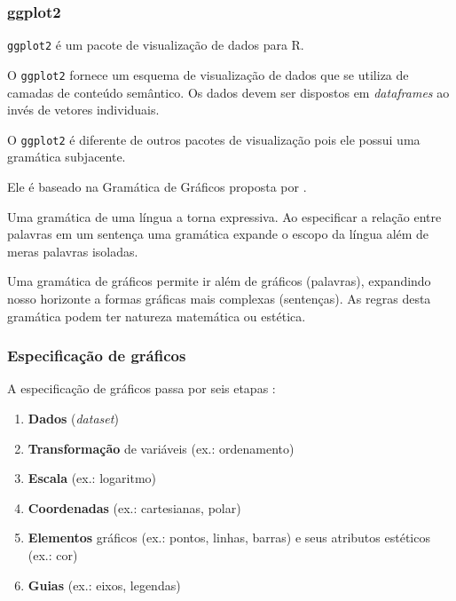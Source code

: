 \begin{frame}[allowframebreaks]
\frametitle{ggplot2}
\texttt{ggplot2} é um pacote de visualização de dados para R.

\vspace{3ex}
O \texttt{ggplot2} fornece um esquema de visualização de dados que se
utiliza de camadas de conteúdo semântico. Os dados devem ser dispostos em \emph{dataframes} 
ao invés de vetores individuais.

\framebreak 

O \texttt{ggplot2} é diferente de outros pacotes de visualização pois ele
possui uma gramática subjacente.

\vspace{3ex}
Ele é baseado na Gramática de Gráficos proposta por \textcite{wilkinson2005grammar}.

\vspace{3ex}
Uma gramática de uma língua a torna expressiva. Ao especificar a relação entre palavras em um sentença
uma gramática expande o escopo da língua além de meras palavras isoladas.

\vspace{3ex}
Uma gramática de gráficos permite ir além de gráficos (palavras), expandindo nosso horizonte a formas
gráficas mais complexas (sentenças). As regras desta gramática podem ter natureza matemática ou estética.
\end{frame}


\begin{frame}
\frametitle{Especificação de gráficos}

A especificação de gráficos passa por seis etapas \cite{wilkinson2005grammar}:
\begin{enumerate}
\item \textbf{Dados} (\emph{dataset})
\item \textbf{Transformação} de variáveis (ex.: ordenamento)
\item \textbf{Escala} (ex.: logaritmo)
\item \textbf{Coordenadas} (ex.: cartesianas, polar)
\item \textbf{Elementos} gráficos (ex.: pontos, linhas, barras) e seus atributos estéticos (ex.: cor)
\item \textbf{Guias} (ex.: eixos, legendas)
\end{enumerate}

\end{frame}

